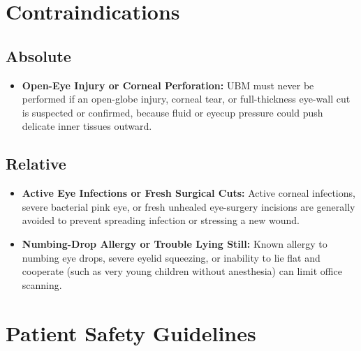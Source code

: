 \section{Contraindications}

\subsection{Absolute}

\begin{itemize}
    \item \textbf{Open-Eye Injury or Corneal Perforation:} UBM must never be performed if an open-globe injury, corneal tear, or full-thickness eye-wall cut is suspected or confirmed, because fluid or eyecup pressure could push delicate inner tissues outward.
\end{itemize}

\subsection{Relative}

\begin{itemize}
    \item \textbf{Active Eye Infections or Fresh Surgical Cuts:} Active corneal infections, severe bacterial pink eye, or fresh unhealed eye-surgery incisions are generally avoided to prevent spreading infection or stressing a new wound.
    \item \textbf{Numbing-Drop Allergy or Trouble Lying Still:} Known allergy to numbing eye drops, severe eyelid squeezing, or inability to lie flat and cooperate (such as very young children without anesthesia) can limit office scanning.
\end{itemize}

\section{Patient Safety Guidelines}

